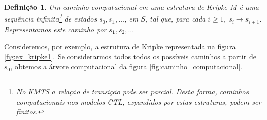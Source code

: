 \documentclass[normaltoc,capchap,capsec,times]{abnt}
\newtheorem{defi}{Definição}[section]
\begin{document}
\begin{defi}\label{def:caminhocomputacional}
\textnormal{\cite{huth} Um caminho computacional em uma estrutura de Kripke $M$ é uma sequência infinita\footnote{No KMTS a relação de transição pode ser parcial. Desta forma, caminhos computacionais nos modelos CTL, expandidos por estas estruturas, podem ser finitos. } de estados $s_0,s_1,\dots$, em $ S$, tal que, para cada $i \geq 1 $, $s_i \to s_{i+1}$. Representamos este caminho por $s_1, s_2, \dots$} 
\end{defi}


Consideremos, por exemplo, a estrutura de Kripke representada na figura \ref{fig:ex_kripke1}. Se considerarmos todos 
todos os possíveis caminhos a partir de $s_0$, obtemos a árvore computacional da figura \ref{fig:caminho_computacional}.
\end{document}
